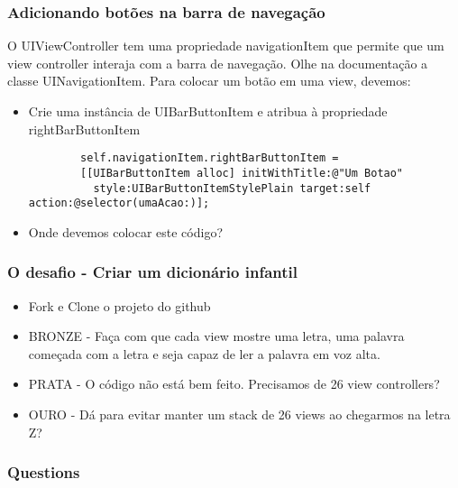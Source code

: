 \documentclass[serif,mathserif]{beamer}
\begin{document}
\begin{frame}[fragile]
  \frametitle{Adicionando botões na barra de navegação}
  O UIViewController tem uma propriedade navigationItem que permite que um view controller interaja com
  a barra de navegação. Olhe na documentação a classe UINavigationItem.
  Para colocar um botão em uma view, devemos:
  \begin{itemize}
    \item Crie uma instância de UIBarButtonItem e atribua à propriedade rightBarButtonItem
      \begin{lstlisting}
        self.navigationItem.rightBarButtonItem =
        [[UIBarButtonItem alloc] initWithTitle:@"Um Botao"
          style:UIBarButtonItemStylePlain target:self action:@selector(umaAcao:)];
        \end{lstlisting}
      \item Onde devemos colocar este código?
  \end{itemize} 
\end{frame}


\begin{frame}
  \frametitle{O desafio - Criar um dicionário infantil}
  \begin{itemize}
  \item Fork e Clone o projeto do github
  \item BRONZE - Faça com que cada view mostre uma letra, uma palavra começada com a letra e seja capaz de ler a palavra em voz alta.
  \item PRATA - O código não está bem feito. Precisamos de 26 view controllers?
  \item OURO - Dá para evitar manter um stack de 26 views ao chegarmos na letra Z?
  \end{itemize}
\end{frame}



  






\begin{frame}
  \frametitle{Questions}
\end{frame}
\end{document}
